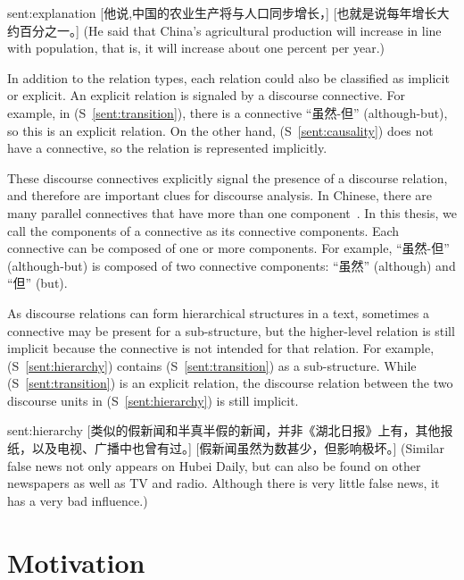 \begin{sent}{sent:explanation}{}
    [他说,中国的农业生产将与人口同步增长，] [也就是说每年增长大约百分之一。]
    (He said that China's agricultural production will increase in line with
    population, that is, it will increase about one percent per year.)
\end{sent}

In addition to the relation types, each relation could also be classified
as implicit or explicit. An explicit relation is signaled by a discourse connective.
For example, in (S~\ref{sent:transition}), there is a connective ``虽然-但''
(although-but), so this is an explicit relation. On the other hand,
(S~\ref{sent:causality}) does not have a connective, so the relation
is represented implicitly.

These discourse connectives explicitly signal the presence of a discourse relation,
and therefore are important clues for discourse analysis.
In Chinese, there are many parallel connectives that have more than one
component~\citep{zhou2012pdtb}.
In this thesis, we call the components of a connective as its connective components.
Each connective can be composed of one or more components. For example, ``虽然-但''
(although-but) is composed of two connective components: ``虽然'' (although)
and ``但'' (but).

As discourse relations can form hierarchical structures in a text, sometimes
a connective may be present for a sub-structure, but the higher-level relation
is still implicit because the connective is not intended for that relation.
For example, (S~\ref{sent:hierarchy}) contains (S~\ref{sent:transition})
as a sub-structure. While (S~\ref{sent:transition}) is an explicit relation,
the discourse relation between the two discourse units in (S~\ref{sent:hierarchy})
is still implicit.

\begin{sent}{sent:hierarchy}{}
    [类似的假新闻和半真半假的新闻，并非《湖北日报》上有，其他报纸，以及电视、广播中也曾有过。]
    [假新闻虽然为数甚少，但影响极坏。]
    (Similar false news not only appears on Hubei Daily, but can also be found on
    other newspapers as well as TV and radio.
    Although there is very little false news, it has a very bad influence.)
\end{sent}



%
%
\section{Motivation}

